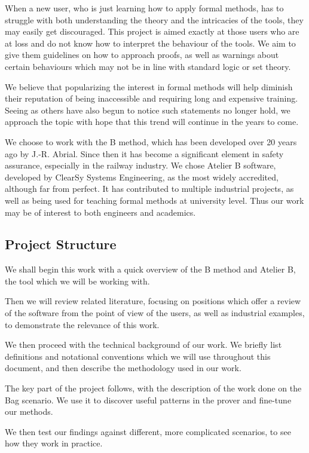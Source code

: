 \documentclass[12pt,journal,duplex]{IEEEtran}
\begin{document}
	When a new user, who is just learning how to apply formal methods, has to struggle with both understanding the theory and the intricacies of the tools, they may easily get discouraged. This project is aimed exactly at those users who are at loss and do not know how to interpret the behaviour of the tools. We aim to give them guidelines on how to approach proofs, as well as warnings about certain behaviours which may not be in line with standard logic or set theory.

	We believe that popularizing the interest in formal methods will help diminish their reputation of being inaccessible and requiring long and expensive training. Seeing as others have also begun to notice such statements no longer hold\cite{amazon}, we approach the topic with hope that this trend will continue in the years to come.

	We choose to work with the B method, which has been developed over 20 years ago by J.-R. Abrial. Since then it has become a significant element in safety assurance, especially in the railway industry. We chose Atelier B software, developed by ClearSy Systems Engineering, as the most widely accredited, although far from perfect. It has contributed to multiple industrial projects, as well as being used for teaching formal methods at university level. Thus our work may be of interest to both engineers and academics.

	\subsection{Project Structure}
	We shall begin this work with a quick overview of the B method and Atelier B, the tool which we will be working with.

	Then we will review related literature, focusing on positions which offer a review of the software from the point of view of the users, as well as industrial examples, to demonstrate the relevance of this work.

	We then proceed with the technical background of our work. We briefly list definitions and notational conventions which we will use throughout this document, and then describe the methodology used in our work.

	The key part of the project follows, with the description of the work done on the Bag scenario. We use it to discover useful patterns in the prover and fine-tune our methods.

	We then test our findings against different, more complicated scenarios, to see how they work in practice.
\end{document}
